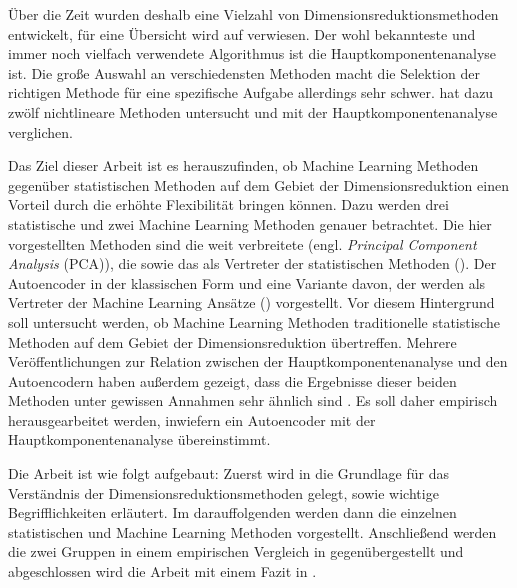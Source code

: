 Über die Zeit wurden deshalb eine Vielzahl von Dimensionsreduktionsmethoden entwickelt, für eine Übersicht wird auf \textcites{Burges.2009}{Sarveniazi.2014}{Sorzano.2014}{Cunningham.2014}{Lee.2007} verwiesen.
Der wohl bekannteste und immer noch vielfach verwendete Algorithmus ist die
Hauptkomponentenanalyse ist. Die große Auswahl an verschiedensten Methoden macht die Selektion der richtigen Methode für eine spezifische Aufgabe allerdings sehr schwer. \Textcite{vanderMaaten.2009} hat dazu zwölf nichtlineare Methoden untersucht und mit der Hauptkomponentenanalyse verglichen.

Das Ziel dieser Arbeit ist es herauszufinden, ob Machine Learning Methoden gegenüber statistischen
Methoden auf dem Gebiet der Dimensionsreduktion einen Vorteil durch die erhöhte Flexibilität
bringen können. Dazu werden drei statistische und zwei Machine Learning Methoden genauer
betrachtet. Die hier vorgestellten Methoden sind die weit verbreitete
 (engl. \textit{Principal Component Analysis} (PCA)), die
 sowie das  als Vertreter der statistischen
Methoden (). Der Autoencoder in der klassischen Form und
eine Variante davon, der  werden als Vertreter der Machine
Learning Ansätze () vorgestellt. Vor diesem Hintergrund soll
untersucht werden, ob Machine Learning Methoden traditionelle statistische Methoden auf dem Gebiet
der Dimensionsreduktion übertreffen. Mehrere Veröffentlichungen zur Relation zwischen der
Hauptkomponentenanalyse und den Autoencodern haben außerdem gezeigt, dass die Ergebnisse dieser
beiden Methoden unter gewissen Annahmen sehr ähnlich sind \parencites{Baldi.1989}{Bourlard.1988}{Plaut.2018}. Es soll daher empirisch herausgearbeitet werden,
inwiefern ein Autoencoder mit der Hauptkomponentenanalyse übereinstimmt.

Die Arbeit ist wie folgt aufgebaut: Zuerst wird in  die Grundlage
für das Verständnis der Dimensionsreduktionsmethoden gelegt, sowie wichtige Begrifflichkeiten
erläutert. Im darauffolgenden  werden dann die einzelnen
statistischen und Machine Learning Methoden vorgestellt. Anschließend werden die zwei Gruppen in
einem empirischen Vergleich in  gegenübergestellt und abgeschlossen wird die
Arbeit mit einem Fazit in .